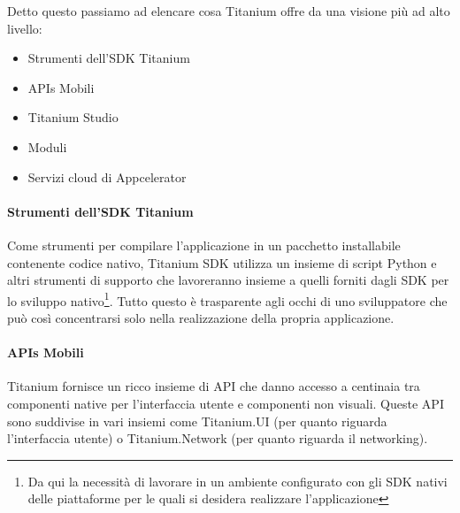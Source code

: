             \clearpage
            \noindent Detto questo passiamo ad elencare cosa Titanium offre da
            una visione più ad alto livello\citep[Cap.2 - Titanium
            Mobile Overview]{Book:Ti}:
            \begin{itemize}
                \item Strumenti dell'SDK Titanium
                \item APIs Mobili
                \item Titanium Studio
                \item Moduli
                \item Servizi cloud di Appcelerator
            \end{itemize}

            \paragraph{Strumenti dell'SDK Titanium}
                Come strumenti per compilare l'applicazione in un pacchetto
                installabile contenente codice nativo, Titanium SDK utilizza un
                insieme di script Python e altri strumenti di supporto che
                lavoreranno insieme a quelli forniti dagli SDK per lo sviluppo
                nativo\footnote{Da qui la necessità di lavorare in un ambiente
                configurato con gli SDK nativi delle piattaforme per le quali si
                desidera realizzare l'applicazione}. Tutto questo è trasparente
                agli occhi di uno sviluppatore che può così concentrarsi solo
                nella realizzazione della propria applicazione.

            \paragraph{APIs Mobili}
                Titanium fornisce un ricco insieme di API \js{} che danno
                accesso a centinaia tra componenti native per l'interfaccia
                utente e componenti non visuali. Queste API sono suddivise in
                vari insiemi come Titanium.UI (per quanto riguarda l'interfaccia
                utente) o Titanium.Network (per quanto riguarda il networking).


